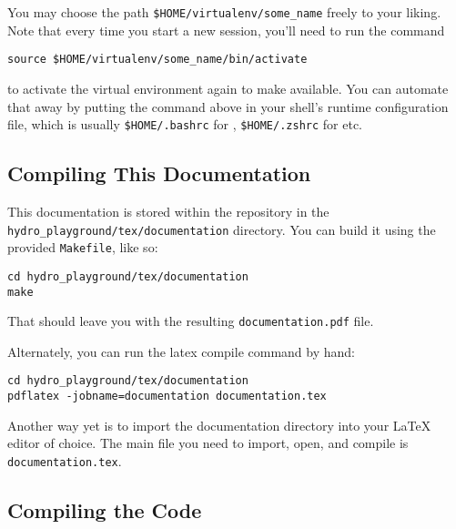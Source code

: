 You may choose the path \verb|$HOME/virtualenv/some_name| freely to your liking.
Note that every time you start a new session, you'll need to run the command

\begin{lstlisting}
source $HOME/virtualenv/some_name/bin/activate
\end{lstlisting}

to activate the virtual environment again to make 
available. You can automate that away by putting the command above in your
shell's runtime configuration file, which is usually \verb|$HOME/.bashrc| for
, \verb|$HOME/.zshrc| for  etc.









\subsection{Compiling This Documentation}\label{chap:documentation}


This documentation is stored within the repository in the
\verb|hydro_playground/tex/documentation| directory. You can build it using the
provided \verb|Makefile|, like so:


\begin{lstlisting}
cd hydro_playground/tex/documentation
make
\end{lstlisting}

That should leave you with the resulting \verb|documentation.pdf| file.

Alternately, you can run the latex compile command by hand:

\begin{lstlisting}
cd hydro_playground/tex/documentation
pdflatex -jobname=documentation documentation.tex
\end{lstlisting}

Another way yet is to import the documentation directory into your LaTeX editor
of choice. The main file you need to import, open, and compile is
\verb|documentation.tex|.









\subsection{Compiling the Code}

